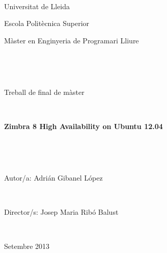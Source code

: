 ~

\begin{center}
{\large Universitat de Lleida}
\par\end{center}{\large \par}

\begin{center}
{\large Escola Polit\`ecnica Superior}
\par\end{center}{\large \par}

\begin{center}
{\large M\`aster en Enginyeria de Programari Lliure}
\par\end{center}{\large \par}



~

~
\begin{center}
{\large Treball de final de m\`aster}
\par\end{center}{\large \par}


~
\begin{center}
{\large \textbf{Zimbra 8 High Availability on Ubuntu 12.04}}
\par\end{center}{\large \par}


~

~


\hfill {\large Autor/a: Adri\'an Gibanel L\'opez}
\par{\large \par}

~

\hfill {\large Director/s: Josep Maria Rib\'o Balust}
\par{\large \par}

~

\hfill {\large Setembre 2013}
\par{\large \par}

\newpage

